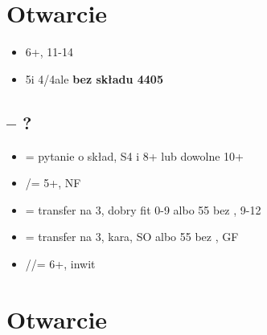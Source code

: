 \documentclass[12pt]{article}
\begin{document}
\newpage
\section{Otwarcie \texorpdfstring{\Cs[2]}{2C}}
\begin{itemize}
    \item 6+\Cs, 11-14
    \item 5\Cs[] i 4\Hs/4\Ss[] ale \textbf{bez składu 4405}
\end{itemize}
\subsection{\texorpdfstring{\Cs[2] – ?}{1C – ?}}
\begin{itemize}
    \item \Ds[2] = pytanie o skład, S4 i 8+ lub dowolne 10+
    \item \Hs[2]/\Ss[] = 5+, NF
    \item \NT[2] = transfer na 3\Cs, dobry fit 0-9 albo 55 bez \Cs, 9-12
    \item \Cs[3] = transfer na 3\Ds, kara, SO albo 55 bez \Cs, GF
    \item \Ds[3]/\Hs/\Ss[] = 6+, inwit
\end{itemize}

\newpage
\section{Otwarcie \texorpdfstring{\Cs[2]}{2C}}
\end{document}
